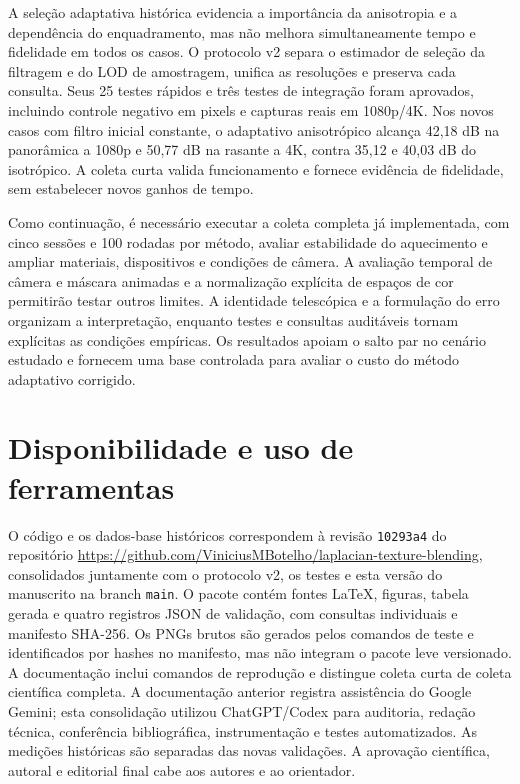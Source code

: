 A seleção adaptativa histórica evidencia a importância da anisotropia e a dependência do enquadramento, mas não melhora simultaneamente tempo e fidelidade em todos os casos. O protocolo v2 separa o estimador de seleção da filtragem e do LOD de amostragem, unifica as resoluções e preserva cada consulta. Seus 25 testes rápidos e três testes de integração foram aprovados, incluindo controle negativo em pixels e capturas reais em 1080p/4K. Nos novos casos com filtro inicial constante, o adaptativo anisotrópico alcança 42,18 dB na panorâmica a 1080p e 50,77 dB na rasante a 4K, contra 35,12 e 40,03 dB do isotrópico. A coleta curta valida funcionamento e fornece evidência de fidelidade, sem estabelecer novos ganhos de tempo.

Como continuação, é necessário executar a coleta completa já implementada, com cinco sessões e 100 rodadas por método, avaliar estabilidade do aquecimento e ampliar materiais, dispositivos e condições de câmera. A avaliação temporal de câmera e máscara animadas e a normalização explícita de espaços de cor permitirão testar outros limites. A identidade telescópica e a formulação do erro organizam a interpretação, enquanto testes e consultas auditáveis tornam explícitas as condições empíricas. Os resultados apoiam o salto par no cenário estudado e fornecem uma base controlada para avaliar o custo do método adaptativo corrigido.

\section*{Disponibilidade e uso de ferramentas}
O código e os dados-base históricos correspondem à revisão \texttt{10293a4} do repositório \url{https://github.com/ViniciusMBotelho/laplacian-texture-blending}, consolidados juntamente com o protocolo v2, os testes e esta versão do manuscrito na branch \texttt{main}. O pacote contém fontes LaTeX, figuras, tabela gerada e quatro registros JSON de validação, com consultas individuais e manifesto SHA-256. Os PNGs brutos são gerados pelos comandos de teste e identificados por hashes no manifesto, mas não integram o pacote leve versionado. A documentação inclui comandos de reprodução e distingue coleta curta de coleta científica completa. A documentação anterior registra assistência do Google Gemini; esta consolidação utilizou ChatGPT/Codex para auditoria, redação técnica, conferência bibliográfica, instrumentação e testes automatizados. As medições históricas são separadas das novas validações. A aprovação científica, autoral e editorial final cabe aos autores e ao orientador.

\balance


